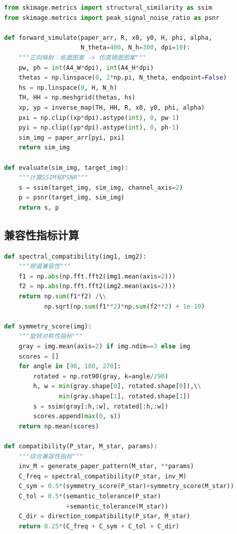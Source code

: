 \begin{lstlisting}[language=Python,caption={正向仿真与SSIM计算}]
from skimage.metrics import structural_similarity as ssim
from skimage.metrics import peak_signal_noise_ratio as psnr

def forward_simulate(paper_arr, R, x0, y0, H, phi, alpha,
                     N_theta=400, N_h=300, dpi=10):
    """正向映射：纸面图案 -> 仿真镜面图案"""
    pw, ph = int(A4_W*dpi), int(A4_H*dpi)
    thetas = np.linspace(0, 2*np.pi, N_theta, endpoint=False)
    hs = np.linspace(0, H, N_h)
    TH, HH = np.meshgrid(thetas, hs)
    xp, yp = inverse_map(TH, HH, R, x0, y0, phi, alpha)
    pxi = np.clip((xp*dpi).astype(int), 0, pw-1)
    pyi = np.clip((yp*dpi).astype(int), 0, ph-1)
    sim_img = paper_arr[pyi, pxi]
    return sim_img

def evaluate(sim_img, target_img):
    """计算SSIM和PSNR"""
    s = ssim(target_img, sim_img, channel_axis=2)
    p = psnr(target_img, sim_img)
    return s, p
\end{lstlisting}

\subsection{兼容性指标计算}

\begin{lstlisting}[language=Python,caption={兼容性指标体系}]
def spectral_compatibility(img1, img2):
    """频谱兼容性"""
    f1 = np.abs(np.fft.fft2(img1.mean(axis=2)))
    f2 = np.abs(np.fft.fft2(img2.mean(axis=2)))
    return np.sum(f1*f2) /\\
           np.sqrt(np.sum(f1**2)*np.sum(f2**2) + 1e-10)

def symmetry_score(img):
    """旋转对称性指标"""
    gray = img.mean(axis=2) if img.ndim==3 else img
    scores = []
    for angle in [90, 180, 270]:
        rotated = np.rot90(gray, k=angle//90)
        h, w = min(gray.shape[0], rotated.shape[0]),\\
               min(gray.shape[1], rotated.shape[1])
        s = ssim(gray[:h,:w], rotated[:h,:w])
        scores.append(max(0, s))
    return np.mean(scores)

def compatibility(P_star, M_star, params):
    """综合兼容性指标"""
    inv_M = generate_paper_pattern(M_star, **params)
    C_freq = spectral_compatibility(P_star, inv_M)
    C_sym = 0.5*(symmetry_score(P_star)+symmetry_score(M_star))
    C_tol = 0.5*(semantic_tolerance(P_star)
                 +semantic_tolerance(M_star))
    C_dir = direction_compatibility(P_star, M_star)
    return 0.25*(C_freq + C_sym + C_tol + C_dir)
\end{lstlisting}
